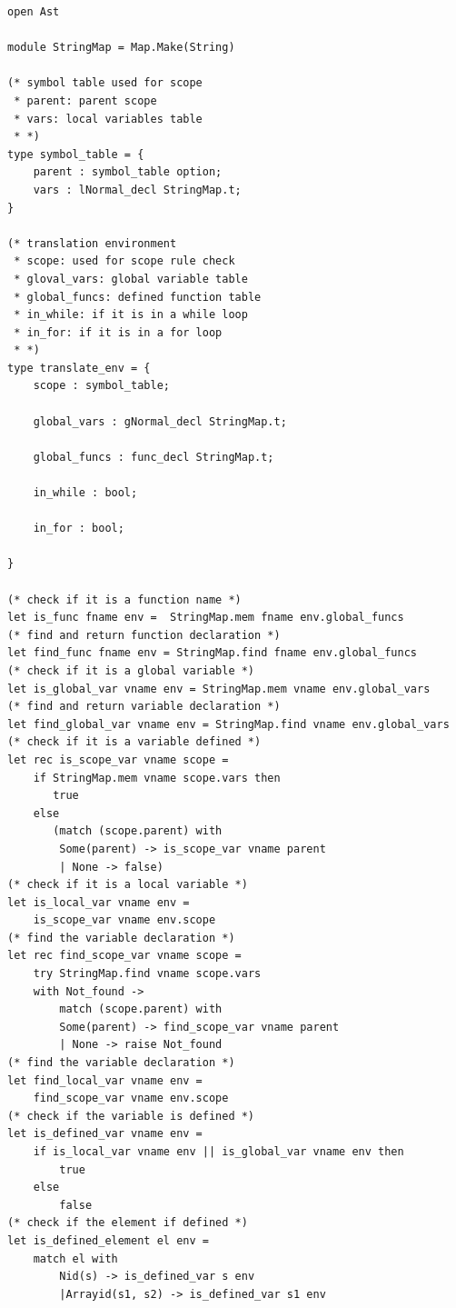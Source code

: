 \documentclass[12pt]{article} %
\begin{document}
\begin{lstlisting}[style=appendix, caption=translate\_env.ml]
open Ast

module StringMap = Map.Make(String)

(* symbol table used for scope
 * parent: parent scope
 * vars: local variables table
 * *)
type symbol_table = {
    parent : symbol_table option;
    vars : lNormal_decl StringMap.t;
}

(* translation environment
 * scope: used for scope rule check
 * gloval_vars: global variable table
 * global_funcs: defined function table
 * in_while: if it is in a while loop
 * in_for: if it is in a for loop
 * *)
type translate_env = {
    scope : symbol_table;

    global_vars : gNormal_decl StringMap.t;

    global_funcs : func_decl StringMap.t;

    in_while : bool;

    in_for : bool;
      
}

(* check if it is a function name *)
let is_func fname env =  StringMap.mem fname env.global_funcs
(* find and return function declaration *)
let find_func fname env = StringMap.find fname env.global_funcs
(* check if it is a global variable *)
let is_global_var vname env = StringMap.mem vname env.global_vars
(* find and return variable declaration *)
let find_global_var vname env = StringMap.find vname env.global_vars
(* check if it is a variable defined *)
let rec is_scope_var vname scope = 
    if StringMap.mem vname scope.vars then
       true
    else
       (match (scope.parent) with
        Some(parent) -> is_scope_var vname parent
        | None -> false)
(* check if it is a local variable *)
let is_local_var vname env = 
    is_scope_var vname env.scope
(* find the variable declaration *)
let rec find_scope_var vname scope =
    try StringMap.find vname scope.vars 
    with Not_found ->
        match (scope.parent) with
        Some(parent) -> find_scope_var vname parent
        | None -> raise Not_found
(* find the variable declaration *)
let find_local_var vname env = 
    find_scope_var vname env.scope
(* check if the variable is defined *)
let is_defined_var vname env =
    if is_local_var vname env || is_global_var vname env then
        true
    else
        false
(* check if the element if defined *)
let is_defined_element el env =
    match el with 
        Nid(s) -> is_defined_var s env
        |Arrayid(s1, s2) -> is_defined_var s1 env
\end{lstlisting}
\end{document}
